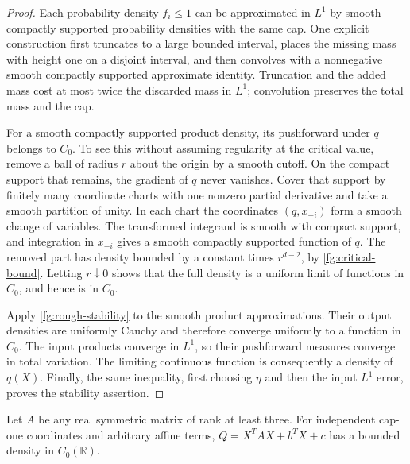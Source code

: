 \begin{proof}
Each probability density $f_i\leq1$ can be approximated in
$L^1$ by smooth compactly supported probability densities
with the same cap.  One explicit construction first
truncates to a large bounded interval, places the missing
mass with height one on a disjoint interval, and then
convolves with a nonnegative smooth compactly supported
approximate identity.  Truncation and the added mass cost
at most twice the discarded mass in $L^1$; convolution
preserves the total mass and the cap.

For a smooth compactly supported product density, its
pushforward under $q$ belongs to $C_0$.
To see this without assuming regularity at the critical
value, remove a ball of radius $r$ about the origin by a
smooth cutoff.  On the compact support that remains, the
gradient of $q$ never vanishes.  Cover that support by
finitely many coordinate charts with one nonzero partial
derivative and take a smooth partition of unity.
In each chart the coordinates $(q,x_{-i})$ form a smooth
change of variables.  The transformed integrand is smooth
with compact support, and integration in $x_{-i}$ gives a
smooth compactly supported function of $q$.
The removed part has density bounded by a constant times
$r^{d-2}$, by \eqref{fg:critical-bound}.
Letting $r\downarrow0$ shows that the full density is a
uniform limit of functions in $C_0$, and hence is in $C_0$.

Apply \eqref{fg:rough-stability} to the smooth product
approximations.  Their output densities are uniformly
Cauchy and therefore converge uniformly to a function in
$C_0$.  The input products converge in $L^1$, so their
pushforward measures converge in total variation.
The limiting continuous function is consequently a
density of $q(X)$.  Finally, the same inequality, first
choosing $\eta$ and then the input $L^1$ error, proves the
stability assertion.
\end{proof}

\begin{theorem}
\label{fg:fixed-matrix-continuity}
Let $A$ be any real symmetric matrix of rank at least three.
For independent cap-one coordinates and arbitrary affine
terms, $Q=X^TAX+b^TX+c$ has a bounded density in
$C_0(\mathbb R)$.
\end{theorem}

